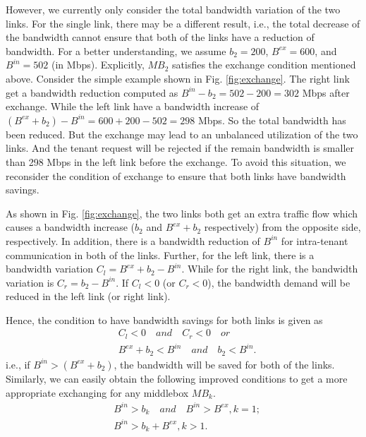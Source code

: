 \documentclass[review]{elsarticle}
\begin{document}
However, we currently only consider the total bandwidth variation of the two links. For the single link, there may be a different result, i.e., the total decrease of the bandwidth cannot ensure that both of the links have a reduction of bandwidth. For a better understanding, we assume $b_2 = 200$, $B^{ex} = 600$, and $B^{in} = 502$ (in Mbps). Explicitly, $MB_2$ satisfies the exchange condition mentioned above. Consider the simple example shown in Fig. \ref{fig:exchange}. The right link get a bandwidth reduction computed as $B^{in}-b_2=502-200=302$ Mbps after exchange. While the left link have a bandwidth increase of $(B^{ex}+b_2)-B^{in}=600+200-502=298$ Mbps. So the total bandwidth has been reduced. But the exchange may lead to an unbalanced utilization of the two links. And the tenant request will be rejected if the remain bandwidth is smaller than 298 Mbps in the left link before the exchange. To avoid this situation, we reconsider the condition of exchange to ensure that both links have bandwidth savings. 

As shown in Fig. \ref{fig:exchange}, the two links both get an extra traffic flow which causes a bandwidth increase ($b_2$ and $B^{ex}+b_2$ respectively) from the opposite side, respectively. In addition, there is a bandwidth reduction of $B^{in}$ for intra-tenant communication in both of the links. Further, for the left link, there is a bandwidth variation $C_l=B^{ex}+b_2-B^{in}$. While for the right link, the bandwidth variation is $C_r=b_2-B^{in}$. If $C_l<0$ (or $C_r<0$), the bandwidth demand will be reduced in the left link (or right link). 

Hence, the condition to have bandwidth savings for both links is given as
\begin{equation}
\begin{aligned}
&C_l<0 \quad and \quad C_r<0 \quad or \\
&B^{ex}+b_2<B^{in} \quad and \quad b_2<B^{in}.
\end{aligned}
\end{equation}
i.e., if $B^{in}>(B^{ex}+b_2)$, the bandwidth will be saved for both of the links. Similarly, we can easily obtain the following improved conditions to get a more appropriate exchanging for any middlebox $MB_k$. 
\begin{equation}
\begin{aligned}
&B^{in}>b_k\quad and \quad B^{in}>B^{ex}, k=1;\\
&B^{in}>b_k+B^{ex}, k>1.
\end{aligned}
\label{equ:condition}
\end{equation}
\end{document}
